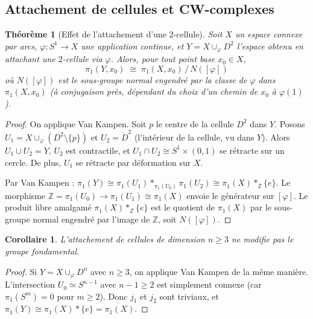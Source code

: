 \documentclass[12pt,a4paper,openany]{book}
\theoremstyle{definition}
\theoremstyle{plain}
\newtheorem{theoreme}[definition]{Théorème}
\newtheorem{corollaire}[definition]{Corollaire}
\theoremstyle{remark}
\newcommand{\Z}{\mathbb{Z}}
\begin{document}
\subsection{Attachement de cellules et CW-complexes}\label{subsec:attachement-cellules}

\begin{theoreme}[Effet de l'attachement d'une $2$-cellule]\label{thm:attachement-cellule}
Soit $X$ un espace connexe par arcs, $\varphi \colon S^1 \to X$ une application continue, et
$Y = X \cup_\varphi D^2$ l'espace obtenu en attachant une $2$-cellule via $\varphi$.
Alors, pour tout point base $x_0 \in X$,
\[
\pi_1(Y, x_0) \;\cong\; \pi_1(X, x_0) \,\big/\, N([\varphi])
\]
où $N([\varphi])$ est le sous-groupe normal engendré par la classe de $\varphi$
dans $\pi_1(X, x_0)$ (à conjugaison près, dépendant du choix d'un chemin de $x_0$ à
$\varphi(1)$).
\end{theoreme}

\begin{proof}
On applique Van Kampen. Soit $p$ le centre de la cellule $D^2$ dans $Y$.
Posons $U_1 = X \cup_\varphi (D^2 \setminus \{p\})$ et $U_2 = \mathring{D}^2$ (l'intérieur
de la cellule, vu dans $Y$). Alors $U_1 \cup U_2 = Y$, $U_2$ est contractile, et
$U_1 \cap U_2 \cong S^1 \times (0,1)$ se rétracte sur un cercle.
De plus, $U_1$ se rétracte par déformation sur $X$.

Par Van Kampen :
$\pi_1(Y) \cong \pi_1(U_1) *_{\pi_1(U_0)} \pi_1(U_2) \cong \pi_1(X) *_\Z \{e\}$.
Le morphisme $\Z = \pi_1(U_0) \to \pi_1(U_1) \cong \pi_1(X)$ envoie le générateur
sur $[\varphi]$. Le produit libre amalgamé $\pi_1(X) *_\Z \{e\}$ est le quotient de
$\pi_1(X)$ par le sous-groupe normal engendré par l'image de $\Z$, soit $N([\varphi])$.
\end{proof}

\begin{corollaire}\label{cor:cellules-dim-sup}
L'attachement de cellules de dimension $n \geq 3$ ne modifie pas le groupe fondamental.
\end{corollaire}

\begin{proof}
Si $Y = X \cup_\varphi D^n$ avec $n \geq 3$, on applique Van Kampen de la même manière.
L'intersection $U_0 \simeq S^{n-1}$ avec $n-1 \geq 2$ est simplement connexe
(car $\pi_1(S^m) = 0$ pour $m \geq 2$). Donc $j_1$ et $j_2$ sont triviaux,
et $\pi_1(Y) \cong \pi_1(X) * \{e\} = \pi_1(X)$.
\end{proof}
\end{document}
